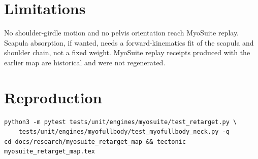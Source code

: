 \documentclass[11pt,a4paper]{article}
\begin{document}
\section{Limitations}

No shoulder-girdle motion and no pelvis orientation reach MyoSuite replay.
Scapula absorption, if wanted, needs a forward-kinematics fit of the
scapula and shoulder chain, not a fixed weight. MyoSuite replay receipts
produced with the earlier map are historical and were not regenerated.

\section{Reproduction}

\begin{verbatim}
python3 -m pytest tests/unit/engines/myosuite/test_retarget.py \
    tests/unit/engines/myofullbody/test_myofullbody_neck.py -q
cd docs/research/myosuite_retarget_map && tectonic myosuite_retarget_map.tex
\end{verbatim}
\end{document}
